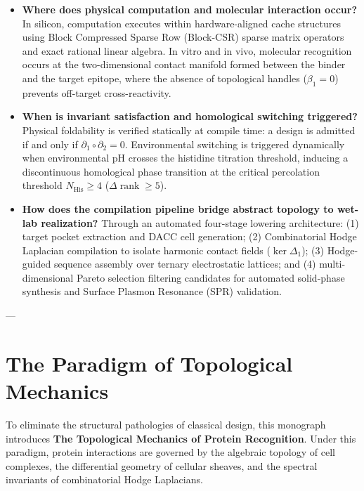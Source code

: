 \begin{itemize}[leftmargin=1.2cm]
    \item \textbf{Where does physical computation and molecular interaction occur?}  
    In silicon, computation executes within hardware-aligned cache structures using Block Compressed Sparse Row (Block-CSR) sparse matrix operators and exact rational linear algebra. In vitro and in vivo, molecular recognition occurs at the two-dimensional contact manifold formed between the binder and the target epitope, where the absence of topological handles ($\beta_1 = 0$) prevents off-target cross-reactivity.

    \item \textbf{When is invariant satisfaction and homological switching triggered?}  
    Physical foldability is verified statically at compile time: a design is admitted if and only if $\partial_1 \circ \partial_2 = 0$. Environmental switching is triggered dynamically when environmental pH crosses the histidine titration threshold, inducing a discontinuous homological phase transition at the critical percolation threshold $N_{\text{His}} \ge 4$ ($\Delta\operatorname{rank} \ge 5$).

    \item \textbf{How does the compilation pipeline bridge abstract topology to wet-lab realization?}  
    Through an automated four-stage lowering architecture: (1) target pocket extraction and DACC cell generation; (2) Combinatorial Hodge Laplacian compilation to isolate harmonic contact fields ($\ker \Delta_1$); (3) Hodge-guided sequence assembly over ternary electrostatic lattices; and (4) multi-dimensional Pareto selection filtering candidates for automated solid-phase synthesis and Surface Plasmon Resonance (SPR) validation.
\end{itemize}

---

\section{The Paradigm of Topological Mechanics}
\label{sec:paradigm_topological}

To eliminate the structural pathologies of classical design, this monograph introduces \textbf{The Topological Mechanics of Protein Recognition}. Under this paradigm, protein interactions are governed by the algebraic topology of cell complexes, the differential geometry of cellular sheaves, and the spectral invariants of combinatorial Hodge Laplacians.

